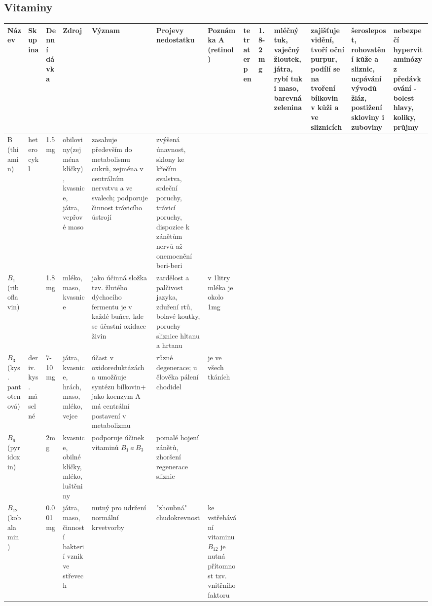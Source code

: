 \begin{landscape}
\subsection{Vitaminy}
    \begin{longtable}{| m{7em} | m{5em} | m{5em} | m{8em}<{\RaggedRight} | m{15em}<{\RaggedRight} | m{15em}<{\RaggedRight} | m{10em}<{\RaggedRight} |}
        \hline
        Název & Skupina & Denní dávka & Zdroj & Význam & Projevy nedostatku & Poznámka 
        \endhead
        \hline
        A (retinol) & tetraterpen & 1.8-2mg & mléčný tuk, vaječný žloutek, játra, rybí tuk i maso, barevná zelenina & zajišťuje vidění, tvoří oční purpur, podílí se na tvoření bílkovin v kůži a ve sliznicích & šeroslepost, rohovatění kůže a sliznic, ucpávání vývodů žláz, postižení skloviny i zuboviny & nebezpečí hypervitaminózy z předávkování - bolest hlavy, koliky, průjmy \\
        \hline
        B (thiamin)& heterocykl & 1.5mg & obiloviny(zejména klíčky), kvasnice, játra, vepřové maso & zasahuje především do metabolismu cukrů, zejména v centrálním nervstvu a ve svalech; podporuje činnost trávicího ústrojí & zvýšená únavnost, sklony ke křečím svalstva, srdeční poruchy, trávicí poruchy, dispozice k zánětům nervů až onemocnění beri-beri & \\
        \hline
        $B_1$ (riboflavin) & & 1.8mg & mléko, maso, kvasnice & jako účinná složka tzv. žlutého dýchacího fermentu je v každé buňce, kde se účastní oxidace živin & zardělost a palčivost jazyka, zduření rtů, bolavé koutky, poruchy sliznice hltanu a hrtanu & v 1litry mléka je okolo 1mg \\
        \hline
        $B_3$ (kys. pantotenová) & deriv. kys. máselné & 7-10mg & játra, kvasnice, hrách, maso, mléko, vejce & účast v oxidoreduktázách a umožňuje syntézu bílkovin+ jako koenzym A má centrální postavení v metabolizmu & různé degenerace; u člověka pálení chodidel & je ve všech tkáních \\
        \hline
        $B_6$ (pyridoxin) & & 2mg & kvasnice, obilné klíčky, mléko, luštěniny & podporuje účinek vitaminů $B_1 ~a~ B_3$ & pomalé hojení zánětů, zhoršení regenerace sliznic & \\
        \hline
        $B_{12}$ (kobalamin)& & 0.001mg & játra, maso, činností bakterií vznik ve střevech & nutný pro udržení normální krvetvorby & "zhoubná" chudokrevnost & ke vstřebávání vitaminu $B_{12}$ je nutná přítomnost tzv. vnitřního faktoru \\

\end{longtable}
\end{landscape}
